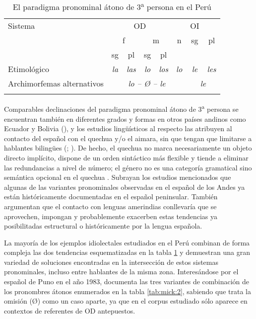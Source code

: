 \documentclass[output=paper]{../langscibook}
\begin{document}
\begin{table}
\caption{\label{tab:mick:1} El paradigma pronominal átono de 3\textsuperscript{a} persona en el Perú}


\begin{tabularx}{\textwidth}{X cc cc ccc}
\lsptoprule
Sistema & \multicolumn{4}{c}{OD} & &{OI}&\\
\cmidrule(lr){2-5}
\cmidrule(lr){6-8}
& \multicolumn{2}{c}{ f} & \multicolumn{2}{c}{ m} & n & sg & pl\\
\cmidrule(lr){2-3}
\cmidrule(lr){4-5}
& sg & pl & sg & pl &  &  & \\
\midrule
Etimológico & \textit{la} & \textit{las} & \textit{lo} & \textit{los} & \textit{lo} & \textit{le} & \textit{les}\\
\cmidrule(lr){2-6}
\cmidrule(lr){7-8}
Archimorfemas alternativos & \multicolumn{5}{c}{ \textit{lo – Ø – le} } & \multicolumn{2}{c}{ \textit{le}}\\
\lspbottomrule
\end{tabularx}
\end{table}

Comparables declinaciones del paradigma pronominal átono de 3\textsuperscript{a} persona se encuentran también en diferentes grados y formas en otros países andinos como Ecuador y Bolivia (\citealt{KleeLynch2009book}), y los estudios lingüísticos al respecto las atribuyen al contacto del español con el quechua y/o el aimara, sin que tengan que limitarse a hablantes bilingües (\citealt{Escobar1978}; \citealt{Escobar2000,PalaciosAlcaine2015}). De hecho, el quechua no marca necesariamente un objeto directo implícito, dispone de un orden sintáctico más flexible y tiende a eliminar las redundancias a nivel de número; el género no es una categoría gramatical sino semántica opcional en el quechua \citep{Pfänder2009}. Subrayan los estudios mencionados que algunas de las variantes pronominales observadas en el español de los Andes ya están históricamente documentadas en el español peninsular. También argumentan que el contacto con lenguas amerindias conllevaría que se aprovechen, impongan y probablemente exacerben estas tendencias ya posibilitadas estructural o históricamente por la lengua española.

La mayoría de los ejemplos idiolectales estudiados en el Perú combinan de forma compleja las dos tendencias esquematizadas en la tabla \ref{tab:mick:1} y demuestran una gran variedad de soluciones encontradas en la intersección de estos sistemas pronominales, incluso entre hablantes de la misma zona. Interesándose por el español de Puno en el año 1983, \citet{Godenzzi1986} documenta las tres variantes de combinación de los pronombres átonos enumerados en la tabla \ref{tab:mick:2}, sabiendo que trata la omisión (Ø) como un caso aparte, ya que en el corpus estudiado sólo aparece en contextos de referentes de OD antepuestos.
\end{document}
